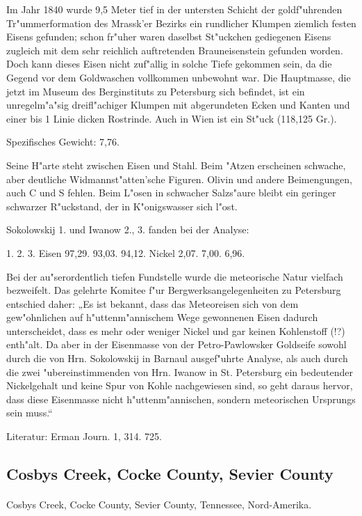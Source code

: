 \documentclass[a4paper, 11pt, oneside]{article}
\begin{document}
Im Jahr 1840 wurde 9,5 Meter tief in der untersten Schicht der goldf"uhrenden Tr"ummerformation des Mrassk'er Bezirks ein rundlicher Klumpen ziemlich festen Eisens gefunden; schon fr"uher waren daselbst St"uckchen gediegenen Eisens zugleich mit dem sehr reichlich auftretenden Brauneisenstein gefunden worden. Doch kann dieses Eisen nicht zuf"allig in solche Tiefe gekommen sein, da die Gegend vor dem Goldwaschen vollkommen unbewohnt war. Die Hauptmasse, die jetzt im Museum des Berginstituts zu Petersburg sich befindet, ist ein unregelm"a"sig dreifl"achiger Klumpen mit abgerundeten Ecken und Kanten und einer bis 1 Linie dicken Rostrinde. Auch in Wien ist ein St"uck (118,125 Gr.).

Spezifisches Gewicht: 7,76.

Seine H"arte steht zwischen Eisen und Stahl. Beim "Atzen erscheinen schwache, aber deutliche Widmannst"atten'sche Figuren. Olivin und andere Beimengungen, auch C und S fehlen. Beim L"osen in schwacher Salzs"aure bleibt ein geringer schwarzer R"uckstand, der in K"onigswasser sich l"ost.

Sokolowskij 1. und Iwanow 2., 3. fanden bei der Analyse:

1. 2. 3.  
Eisen 97,29. 93,03. 94,12.  
Nickel 2,07. 7,00. 6,96.

Bei der au"serordentlich tiefen Fundstelle wurde die meteorische Natur vielfach bezweifelt. Das gelehrte Komitee f"ur Bergwerksangelegenheiten zu Petersburg entschied daher: „Es ist bekannt, dass das Meteoreisen sich von dem gew"ohnlichen auf h"uttenm"annischem Wege gewonnenen Eisen dadurch unterscheidet, dass es mehr oder weniger Nickel und gar keinen Kohlenstoff (!?) enth"alt. Da aber in der Eisenmasse von der Petro-Pawlowsker Goldseife sowohl durch die von Hrn. Sokolowskij in Barnaul ausgef"uhrte Analyse, als auch durch die zwei "ubereinstimmenden von Hrn. Iwanow in St. Petersburg ein bedeutender Nickelgehalt und keine Spur von Kohle nachgewiesen sind, so geht daraus hervor, dass diese Eisenmasse nicht h"uttenm"annischen, sondern meteorischen Ursprungs sein muss.“

Literatur: Erman Journ. 1, 314. 725.

\subsection{Cosbys Creek, Cocke County, Sevier County}
\normalsize
\paragraph{}
Cosbys Creek, Cocke County, Sevier County, Tennessee, Nord-Amerika.
\end{document}
